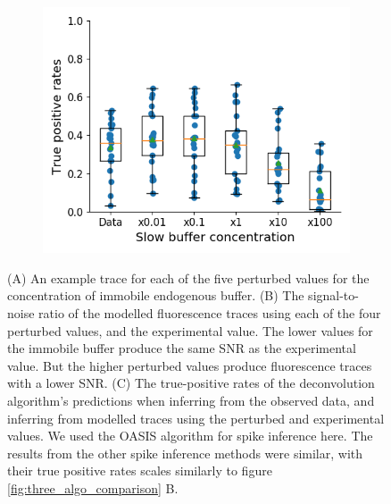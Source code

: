 \begin{figure}[p]
\begin{subfigure}{0.45\textwidth}
        \includegraphics[width=\linewidth]{figures/calcium_chapter/immobile_perturbed_oasis_first_paper.png}
        \caption{}
    \end{subfigure}
    \caption{(A) An example trace for each of the five perturbed values for the concentration of immobile endogenous buffer.	(B) The signal-to-noise ratio of the modelled fluorescence traces using each of the four perturbed values, and the experimental value. The lower values for the immobile buffer produce the same SNR as the experimental value. But the higher perturbed values produce fluorescence traces with a lower SNR.	(C) The true-positive rates of the deconvolution algorithm's predictions when inferring from the observed data, and inferring from modelled traces using the perturbed and experimental values. We used the OASIS algorithm for spike inference here. The results from the other spike inference methods were similar, with their true positive rates scales similarly to figure \ref{fig:three_algo_comparison} B.}
    \label{fig:endogenous_perturbed}
\end{figure}

